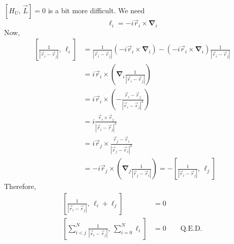 $[H_U,\,\vec{L}]=0$ is a bit more difficult. We need
\begin{equation}
\boldsymbol{\ell}_i = -i\vec{r}_i \times \boldsymbol{\nabla}_i
\end{equation}
Now,
\begin{align}
\left[\frac{1}{|\vec{r}_i-\vec{r}_j|},\,\boldsymbol{\ell}_i \right] & = \frac{1}{|\vec{r}_i-\vec{r}_j|}(-i\vec{r}_i \times \boldsymbol{\nabla}_i) - (-i\vec{r}_i \times \boldsymbol{\nabla}_i)\frac{1}{|\vec{r}_i-\vec{r}_j|} \nonumber \\
& = i\vec{r}_i \times \left( \boldsymbol{\nabla}_i \frac{1}{|\vec{r}_i-\vec{r}_j|} \right) \nonumber \\
& = i\vec{r}_i \times \left( -\frac{\vec{r}_i-\vec{r}_j}{|\vec{r}_i-\vec{r}_j|^3} \right) \nonumber \\
& = i \frac{\vec{r}_i \times \vec{r}_j}{|\vec{r}_i-\vec{r}_j|^3} \nonumber \\
& = i\vec{r}_j \times \frac{\vec{r}_j-\vec{r}_i}{|\vec{r}_j-\vec{r}_i|^3} \nonumber \\
& = -i\vec{r}_j \times \left( \boldsymbol{\nabla}_j \frac{1}{|\vec{r}_j-\vec{r}_i|} \right)
= -\left[\frac{1}{|\vec{r}_i-\vec{r}_j|},\,\boldsymbol{\ell}_j \right]
\end{align}
Therefore,
\begin{align}
\left[\frac{1}{|\vec{r}_i-\vec{r}_j|},\,\boldsymbol{\ell}_i+\boldsymbol{\ell}_j \right] & = 0 \\
\left[\sum_{i<j}^N \frac{1}{|\vec{r}_i - \vec{r}_j|},\,\sum_{i=0}^N\boldsymbol{\ell}_i \right] & = 0 \qquad \text{Q.E.D.}
\end{align}

